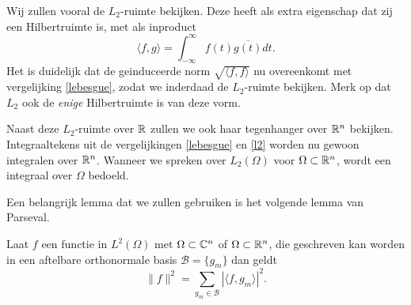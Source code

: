 Wij zullen vooral de $L_2$-ruimte bekijken. Deze heeft als extra eigenschap dat zij een Hilbertruimte is, 
met als inproduct
\begin{equation}
	\label{l2}
	\langle f, g \rangle = \int_{-\infty}^\infty f(t) \overline{g(t)} dt.
\end{equation}
Het is duidelijk dat de geinduceerde norm $\sqrt{\langle f, f \rangle}$ nu overeenkomt met vergelijking \ref{lebesgue}, zodat we inderdaad de $L_2$-ruimte bekijken. Merk op dat $L_2$ ook de \emph{enige} Hilbertruimte is van deze vorm.

Naast deze $L_2$-ruimte over $\mathbb{R}$ zullen we ook haar tegenhanger over $\mathbb{R}^n$ bekijken. Integraaltekens uit de vergelijkingen \ref{lebesgue} en \ref{l2} worden nu gewoon integralen over $\mathbb{R}^n$. Wanneer we spreken over $L_2(\Omega)$ voor $\Omega \subset \mathbb{R}^n$, wordt een integraal over $\Omega$ bedoeld.

Een belangrijk lemma dat we zullen gebruiken is het volgende lemma van Parseval.
\begin{lemm}
  \label{parseval}
  Laat $f$ een functie in $L^2(\Omega)$ met $\Omega \subset \mathbb{C}^n$ of $\Omega\subset\mathbb{R}^n$, die geschreven kan worden in een aftelbare 
  orthonormale basis $\mathcal{B}=\{g_m\}$ dan geldt
  \[
  \|f\|^2 = \sum_{g_m\in\mathcal{B}} | \langle f, g_m \rangle |^2.
  \]
\end{lemm}


